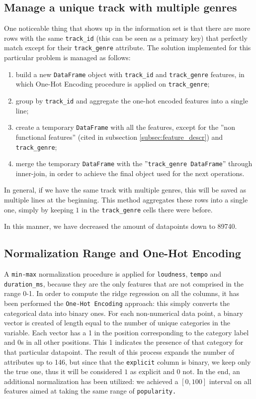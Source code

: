 \documentclass{article}
\begin{document}
\subsection{Manage a unique track with multiple genres}
\label{subsec:track_genre}
One noticeable thing that shows up in the information set is that there are more rows with the same \texttt{track\_id} (this can be seen as a primary key) that perfectly match except for their \texttt{track\_genre} attribute. 
The solution implemented for this particular problem is managed as follows:
\begin{enumerate}
	\item build a new \texttt{DataFrame} object with \texttt{track\_id} and \texttt{track\_genre} features, in which One-Hot Encoding procedure is applied on \texttt{track\_genre}; 
	\item group by \texttt{track\_id} and aggregate the one-hot encoded features into a single line;
	\item create a temporary \texttt{DataFrame} with all the features, except for the ''non functional features'' (cited in subsection \ref{subsec:feature_descr}) and \texttt{track\_genre};
	\item merge the temporary \texttt{DataFrame} with the ''\texttt{track\_genre DataFrame}'' through inner-join, in order to achieve the final object used for the next operations.
	              
\end{enumerate}
In general, if we have the same track with multiple genres, this will be saved as multiple lines at the beginning. This method aggregates these rows into a single one, simply by keeping $1$ in the \texttt{track\_genre} cells there were before. 
    
In this manner, we have decreased the amount of datapoints down to 89740.

\subsection{Normalization Range and One-Hot Encoding}
A \texttt{min-max} normalization procedure is applied for \texttt{loudness}, \texttt{tempo} and  \texttt{duration\_ms}, because they are the only features that are not comprised in the range 0-1.\newline
In order to compute the ridge regression on all the columns, it has been performed the \texttt{One-Hot Encoding} approach: this simply converts the categorical data into binary ones. For each non-numerical data point, a binary vector is created of length equal to the number of unique categories in the variable. Each vector has a 1 in the position corresponding to the category label and 0s in all other positions. This 1 indicates the presence of that category for that particular datapoint. The result of this process expands the number of attributes up to 146, but since that the \texttt{explicit} column is binary, we keep only the true one, thus it will be considered $1$ as explicit and $0$ not. 
In the end, an additional normalization has been utilized: we achieved a $[0,100]$ interval on all features aimed at taking the same range of \texttt{popularity.}
\end{document}
